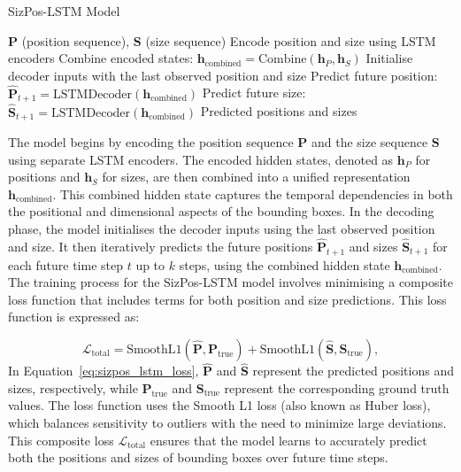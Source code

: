 \documentclass[12pt,oneside]{book} %
\begin{document}
\begin{algorithm}[H]
    \caption{SizPos-LSTM Model}\label{alg:lstm_sizpos}
    \begin{algorithmic}[1]
        \Require $\mathbf{P}$ (position sequence), $\mathbf{S}$ (size sequence)
        \State Encode position and size using LSTM encoders
        \State Combine encoded states: $\mathbf{h}_{\text{combined}} = \text{Combine}(\mathbf{h}_P, \mathbf{h}_S)$
        \State Initialise decoder inputs with the last observed position and size
         
        \State Predict future position: $\hat{\mathbf{P}}_{t+1} = \text{LSTMDecoder}(\mathbf{h}_{\text{combined}})$
        \State Predict future size: $\hat{\mathbf{S}}_{t+1} = \text{LSTMDecoder}(\mathbf{h}_{\text{combined}})$
        \EndFor
        \State \Return Predicted positions and sizes
    \end{algorithmic}
\end{algorithm}

\noindent The model begins by encoding the position sequence $\mathbf{P}$ and the size sequence $\mathbf{S}$ using separate LSTM encoders. The encoded hidden states, denoted as $\mathbf{h}_P$ for positions and $\mathbf{h}_S$ for sizes, are then combined into a unified representation $\mathbf{h}_{\text{combined}}$. This combined hidden state captures the temporal dependencies in both the positional and dimensional aspects of the bounding boxes.
In the decoding phase, the model initialises the decoder inputs using the last
observed position and size. It then iteratively predicts the future positions
$\hat{\mathbf{P}}_{t+1}$ and sizes $\hat{\mathbf{S}}_{t+1}$ for each future
time step $t$ up to $k$ steps, using the combined hidden state
$\mathbf{h}_{\text{combined}}$. The training process for the SizPos-LSTM model involves minimising a composite
loss function that includes terms for both position and size predictions. This
loss function is expressed as:

\begin{equation}
    \mathcal{L}_{\text{total}} = \text{SmoothL1}(\hat{\mathbf{P}}, \mathbf{P}_{\text{true}}) + \text{SmoothL1}(\hat{\mathbf{S}}, \mathbf{S}_{\text{true}}), \label{eq:sizpos_lstm_loss}
\end{equation}
In Equation~\eqref{eq:sizpos_lstm_loss}, $\hat{\mathbf{P}}$ and $\hat{\mathbf{S}}$ represent the predicted positions and sizes, respectively, while $\mathbf{P}_{\text{true}}$ and $\mathbf{S}_{\text{true}}$ represent the corresponding ground truth values. The loss function uses the Smooth L1 loss (also known as Huber loss), which balances sensitivity to outliers with the need to minimize large deviations. This composite loss $\mathcal{L}_{\text{total}}$ ensures that the model learns to accurately predict both the positions and sizes of bounding boxes over future time steps.
\end{document}
